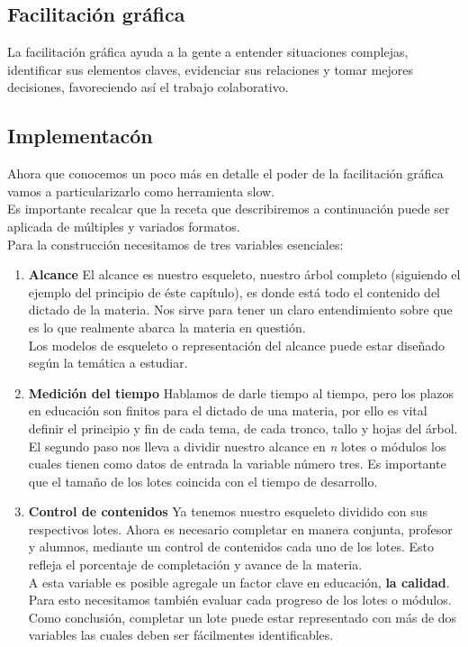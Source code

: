 \subsection{Facilitaci\'on gr\'afica}
La facilitaci\'on gr\'afica ayuda a la gente a entender situaciones complejas, identificar sus elementos claves, evidenciar sus relaciones y tomar mejores 
decisiones, favoreciendo as\'i el trabajo colaborativo.\cite{fg}\\
\subsection{Implementac\'on}
Ahora que conocemos un poco m\'as en detalle el poder de la facilitaci\'on gr\'afica vamos a particularizarlo como herramienta slow.\\
Es importante recalcar que la receta que describiremos a continuaci\'on puede ser aplicada de m\'ultiples y variados formatos.\\
Para la construcci\'on necesitamos de tres variables esenciales:
\begin{enumerate}
 \item \textbf{Alcance}
 El alcance es nuestro esqueleto, nuestro \'arbol completo (siguiendo el ejemplo del principio de \'este cap\'itulo), es donde est\'a todo el contenido del 
 dictado de la materia. Nos sirve para tener un claro entendimiento sobre que es lo que realmente abarca la materia en questi\'on.\\
 Los modelos de esqueleto o representaci\'on del alcance puede estar dise\~nado seg\'un la tem\'atica a estudiar.
 \item \textbf{Medici\'on del tiempo}
 Hablamos de darle tiempo al tiempo, pero los plazos en educaci\'on son finitos para el dictado de una materia, por ello es vital definir el principio y fin de 
 cada tema, de cada tronco, tallo y hojas del \'arbol. El segundo paso nos lleva a dividir nuestro alcance en \textit{n} lotes o m\'odulos los cuales tienen
 como datos de entrada la variable n\'umero tres. Es importante que el tama\~no de los lotes coincida con el tiempo de desarrollo.
 \item \textbf{Control de contenidos}
 Ya tenemos nuestro esqueleto dividido con sus respectivos lotes. Ahora es necesario completar en manera conjunta, profesor y alumnos, mediante un control de 
 contenidos cada uno de los lotes. Esto refleja el porcentaje de completaci\'on y avance de la materia.\\
 A esta variable es posible agregale un factor clave en educaci\'on, \textbf{la calidad}. Para esto necesitamos tambi\'en evaluar cada progreso de los lotes o
 m\'odulos. Como conclusi\'on, completar un lote puede estar representado con m\'as de dos variables las cuales deben ser f\'acilmentes identificables.
\end{enumerate}


